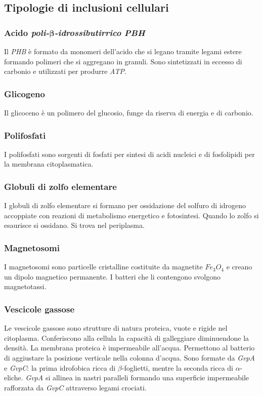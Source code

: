 	\subsection{Tipologie di inclusioni cellulari}

		\subsubsection{Acido \emph{poli-$\mathbf{\beta}$-idrossibutirrico} \emph{PBH}}
		Il \emph{PHB} \`e formato da monomeri dell'acido che si legano tramite legami estere formando polimeri che si aggregano in granuli.
		Sono sintetizzati in eccesso di carbonio e utilizzati per produrre \emph{ATP}.

		\subsubsection{Glicogeno}
		Il glicoceno \`e un polimero del glucosio, funge da riserva di energia e di carbonio.

		\subsubsection{Polifosfati}
		I polifosfati sono sorgenti di fosfati per sintesi di acidi nucleici e di fosfolipidi per la membrana citoplasmatica.


		\subsubsection{Globuli di zolfo elementare}
		I globuli di zolfo elementare si formano per ossidazione del solfuro di idrogeno accoppiate con reazioni di metabolismo energetico e fotosintesi.
		Quando lo zolfo si esaurisce si ossidano.
		Si trova nel periplasma.


		\subsubsection{Magnetosomi}
		I magnetosomi sono particelle cristalline costituite da magnetite \emph{$Fe_3O_4$} e creano un dipolo magnetico permanente.
			I batteri che li contengono svolgono magnetotassi.


		\subsubsection{Vescicole gassose}
		Le vescicole gassose sono strutture di natura proteica, vuote e rigide nel citoplasma.
		Conferiscono alla cellula la capacit\`a di galleggiare diminuendone la densit\`a.
		La membrana proteica \`e impermeabile all'acqua.
		Permettono al batterio di aggiustare la posizione verticale nella colonna d'acqua.
		Sono formate da \emph{GvpA} e \emph{GvpC}: la prima idrofobica ricca di $\beta$-foglietti, mentre la seconda ricca di $\alpha$-eliche.
		\emph{GvpA} si allinea in nastri paralleli formando una superficie impermeabile rafforzata da \emph{GvpC} attraverso legami crociati.

